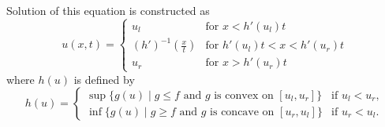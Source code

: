 Solution of this equation is constructed as
\begin{equation}
    u(x,t)=
    \begin{cases}
        u_{l}                  & \text{for } x < h'(u_l)t            \\
        (h')^{-1}(\frac{x}{t}) & \text{for } h'(u_l)t < x < h'(u_r)t \\
        u_{r}                  & \text{for } x > h'(u_r)t
    \end{cases}
\end{equation}
where $h(u)$ is defined by
\begin{equation}
    h(u) =
    \begin{cases}
        \sup\{ g(u) \mid g \leq f \text{ and } g \text{ is convex on } [u_l, u_r] \}  & \text{if } u_l < u_r, \\
        \inf\{ g(u) \mid g \geq f \text{ and } g \text{ is concave on } [u_r, u_l] \} & \text{if } u_r < u_l.
    \end{cases}
\end{equation}
